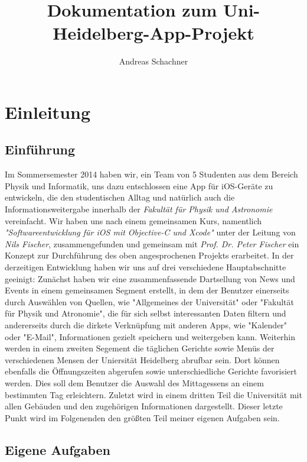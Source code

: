 \documentclass{report}
\author{Andreas Schachner}
\title{Dokumentation zum Uni-Heidelberg-App-Projekt}
\begin{document}
\maketitle
\newpage
\setcounter{page}{1}
\tableofcontents
\newpage
{}

\chapter{Einleitung}

\section{Einführung}

Im Sommersemester 2014 haben wir, ein Team von 5 Studenten aus dem Bereich Physik und Informatik, uns dazu entschlossen eine App für iOS-Geräte zu entwickeln, die den studentischen Alltag und natürlich auch die Informationsweitergabe innerhalb der \emph{Fakultät für Physik und Astronomie} vereinfacht. Wir haben uns nach einem gemeinsamen Kurs, namentlich \emph{"Softwareentwicklung für iOS mit Objective-C und Xcode"} unter der Leitung von \emph{Nils Fischer}, zusammengefunden und gemeinsam mit \emph{Prof. Dr. Peter Fischer} ein Konzept zur Durchführung des oben angesprochenen Projekts erarbeitet. In der derzeitigen Entwicklung haben wir uns auf drei verschiedene Hauptabschnitte geeinigt: Zunächst haben wir eine zusammenfassende Dartsellung von News und Events in einem gemeinsamen Segment erstellt, in dem der Benutzer einerseits durch Auswählen von Quellen, wie "Allgemeines der Universität" oder "Fakultät für Physik und Atronomie", die für sich selbst interessanten Daten filtern und andererseits durch die dirkete Verknüpfung mit anderen Apps, wie "Kalender" oder "E-Mail", Informationen gezielt speichern und weitergeben kann. Weiterhin werden in einem zweiten Segement die täglichen Gerichte sowie Menüs der verschiedenen Mensen der Uniersität Heidelberg abrufbar sein. Dort können ebenfalls die Öffnungszeiten abgerufen sowie unterschiedliche Gerichte favorisiert werden. Dies soll dem Benutzer die Auswahl des Mittagessens an einem bestimmten Tag erleichtern. Zuletzt wird in einem dritten Teil die Universität mit allen Gebäuden und den zugehörigen Informationen dargestellt. Dieser letzte Punkt wird im Folgenenden den größten Teil meiner eigenen Aufgaben sein.

\section{Eigene Aufgaben}
\end{document}
